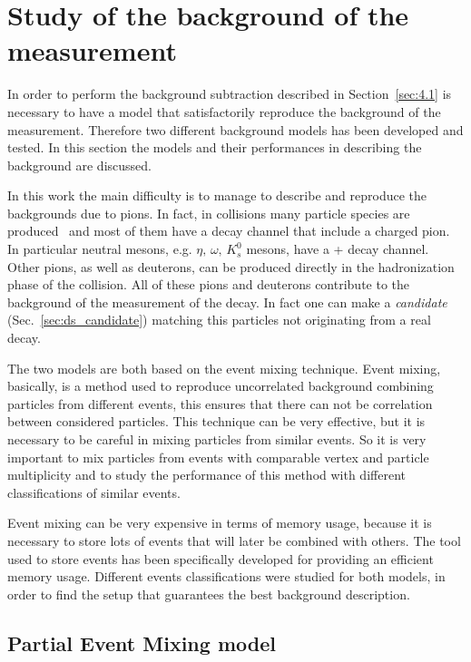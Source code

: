 %
%
\section{Study of the background of the measurement} \label{sec:background}

In order to perform the background subtraction described in Section~\ref{sec:4.1} is necessary to have
a model that satisfactorily reproduce the background of the measurement. 
Therefore two different background models has been developed and tested. 
In this section the models and their performances in describing the background are discussed.

In this work the main difficulty is to manage to describe and reproduce the backgrounds due to pions.
In fact, in \pPb collisions many particle species are produced~\cite{pkp_prod, neutralp, k0s_prod} 
and most of them have a decay channel that include a charged pion.
In particular neutral mesons, e.g. $\eta,\,\omega,\,K_{s}^{0}$ mesons, have a 
\pip + \pim decay channel. Other pions, as well as deuterons, can be produced directly
in the hadronization phase of the collision.
All of these pions and deuterons contribute to the background of the measurement of the
\dstdecay decay. In fact one can make a \textit{\ds candidate} (Sec.~\ref{sec:ds_candidate})
matching this particles not originating from a real \ds decay.

The two models are both based on the event mixing technique.
Event mixing, basically, is a method used to reproduce uncorrelated background combining particles from
different events, this ensures that there can not be correlation between considered particles.
This technique can be very effective, but it is necessary to be careful in mixing particles from 
similar events.
So it is very important to mix particles from events with comparable vertex and particle multiplicity 
and to study the performance of this method with different classifications of similar events.

Event mixing can be very expensive in terms of memory usage, because it is necessary to store
lots of events that will later be combined with others.
The tool used to store events has been specifically developed for providing an efficient memory usage.
Different events classifications were studied for both models, in order to find the setup that 
guarantees the best background description.

%
\subsection{Partial Event Mixing model} \label{sec:pem}

